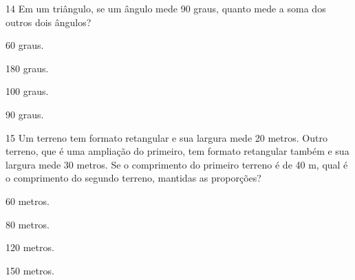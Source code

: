 
\num{14} Em um triângulo, se um ângulo mede 90 graus, quanto mede a soma dos
outros dois ângulos?

\begin{escolha}
\item 60 graus.
\item 180 graus.
\item 100 graus.
\item 90 graus.
\end{escolha}







\num{15} Um terreno tem formato retangular e sua largura mede 20 metros. Outro
terreno, que é uma ampliação do primeiro, tem formato retangular também
e sua largura mede 30 metros. Se o comprimento do primeiro terreno é de 40 m,
qual é o comprimento do segundo terreno, mantidas as proporções?

\begin{escolha}
\item 60 metros.
\item 80 metros.
\item 120 metros.
\item 150 metros.
\end{escolha}




